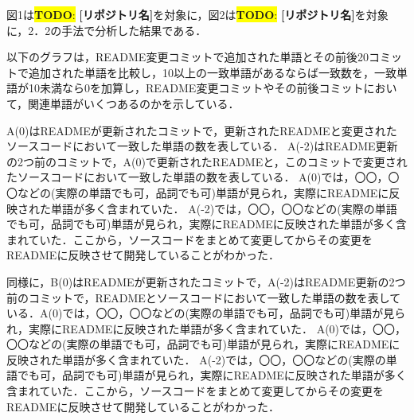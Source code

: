 \documentclass[uplatex,dvipdfmx,a4paper,twocolumn,base=11pt,jbase=11pt,ja=standard]{bxjsarticle}  %
\newcommand{\todo}[1]{\colorbox{yellow}{{\bf TODO}:}{\color{red} {\textbf{[#1]}}}}
\begin{document}

図1は\todo{リポジトリ名}を対象に，図2は\todo{リポジトリ名}を対象に，2．2の手法で分析した結果である．


以下のグラフは，README変更コミットで追加された単語とその前後20コミットで追加された単語を比較し，10以上の一致単語があるならば一致数を，一致単語が10未満なら0を加算し，README変更コミットやその前後コミットにおいて，関連単語がいくつあるのかを示している．

A(0)はREADMEが更新されたコミットで，更新されたREADMEと変更されたソースコードにおいて一致した単語の数を表している．
A(-2)はREADME更新の2つ前のコミットで，A(0)で更新されたREADMEと，このコミットで変更されたソースコードにおいて一致した単語の数を表している．
A(0)では，〇〇，〇〇などの(実際の単語でも可，品詞でも可)単語が見られ，実際にREADMEに反映された単語が多く含まれていた．
A(-2)では，〇〇，〇〇などの(実際の単語でも可，品詞でも可)単語が見られ，実際にREADMEに反映された単語が多く含まれていた．ここから，ソースコードをまとめて変更してからその変更をREADMEに反映させて開発していることがわかった．



同様に，B(0)はREADMEが更新されたコミットで，A(-2)はREADME更新の2つ前のコミットで，READMEとソースコードにおいて一致した単語の数を表している．A(0)では，〇〇，〇〇などの(実際の単語でも可，品詞でも可)単語が見られ，実際にREADMEに反映された単語が多く含まれていた．
A(0)では，〇〇，〇〇などの(実際の単語でも可，品詞でも可)単語が見られ，実際にREADMEに反映された単語が多く含まれていた．
A(-2)では，〇〇，〇〇などの(実際の単語でも可，品詞でも可)単語が見られ，実際にREADMEに反映された単語が多く含まれていた．ここから，ソースコードをまとめて変更してからその変更をREADMEに反映させて開発していることがわかった．
\end{document}

